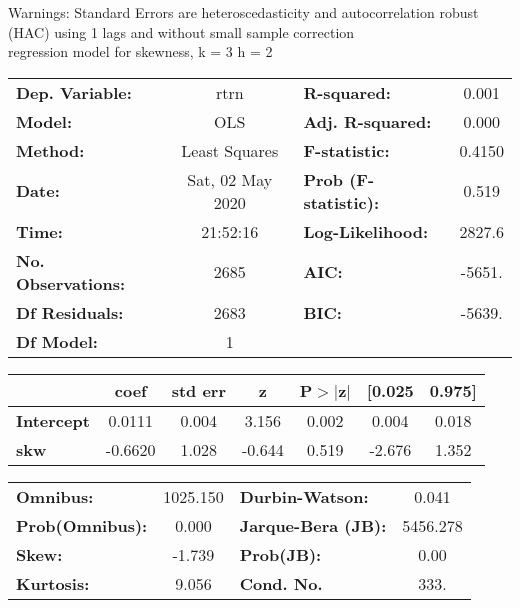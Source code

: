 Warnings: \newline
 [1] Standard Errors are heteroscedasticity and autocorrelation robust (HAC) using 1 lags and without small sample correction\\ 

regression model for skewness, k = 3 h = 2\begin{center}
\begin{tabular}{lclc}
\toprule
\textbf{Dep. Variable:}    &       rtrn       & \textbf{  R-squared:         } &     0.001   \\
\textbf{Model:}            &       OLS        & \textbf{  Adj. R-squared:    } &     0.000   \\
\textbf{Method:}           &  Least Squares   & \textbf{  F-statistic:       } &    0.4150   \\
\textbf{Date:}             & Sat, 02 May 2020 & \textbf{  Prob (F-statistic):} &    0.519    \\
\textbf{Time:}             &     21:52:16     & \textbf{  Log-Likelihood:    } &    2827.6   \\
\textbf{No. Observations:} &        2685      & \textbf{  AIC:               } &    -5651.   \\
\textbf{Df Residuals:}     &        2683      & \textbf{  BIC:               } &    -5639.   \\
\textbf{Df Model:}         &           1      & \textbf{                     } &             \\
\bottomrule
\end{tabular}
\begin{tabular}{lcccccc}
                   & \textbf{coef} & \textbf{std err} & \textbf{z} & \textbf{P$> |$z$|$} & \textbf{[0.025} & \textbf{0.975]}  \\
\midrule
\textbf{Intercept} &       0.0111  &        0.004     &     3.156  &         0.002        &        0.004    &        0.018     \\
\textbf{skw}       &      -0.6620  &        1.028     &    -0.644  &         0.519        &       -2.676    &        1.352     \\
\bottomrule
\end{tabular}
\begin{tabular}{lclc}
\textbf{Omnibus:}       & 1025.150 & \textbf{  Durbin-Watson:     } &    0.041  \\
\textbf{Prob(Omnibus):} &   0.000  & \textbf{  Jarque-Bera (JB):  } & 5456.278  \\
\textbf{Skew:}          &  -1.739  & \textbf{  Prob(JB):          } &     0.00  \\
\textbf{Kurtosis:}      &   9.056  & \textbf{  Cond. No.          } &     333.  \\
\bottomrule
\end{tabular}
\end{center}


